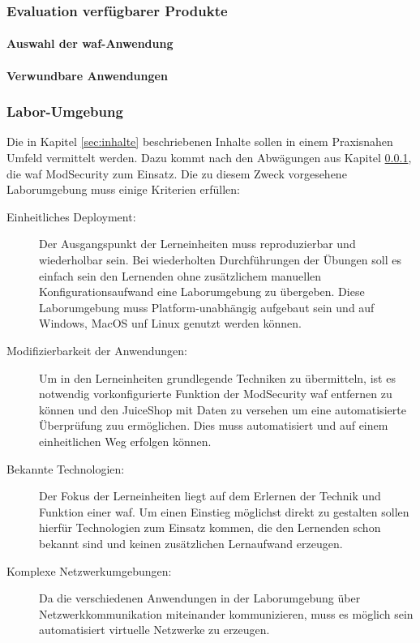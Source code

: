 \subsubsection{Evaluation verfügbarer Produkte}
\label{sec:produkt-eval}
\paragraph{Auswahl der \ac{waf}-Anwendung}

\paragraph{Verwundbare Anwendungen}

\subsubsection{Labor-Umgebung}

Die in Kapitel \ref{sec:inhalte} beschriebenen Inhalte sollen in einem Praxisnahen Umfeld vermittelt werden.
Dazu kommt nach den Abwägungen aus Kapitel \ref{sec:produkt-eval}, die \ac{waf} ModSecurity zum Einsatz.
Die zu diesem Zweck vorgesehene Laborumgebung muss einige Kriterien erfüllen:
\begin{description}
    \item[Einheitliches Deployment:] Der Ausgangspunkt der Lerneinheiten muss reproduzierbar und wiederholbar sein. 
    Bei wiederholten Durchführungen der Übungen soll es einfach sein den Lernenden ohne zusätzlichem manuellen Konfigurationsaufwand eine Laborumgebung zu übergeben. 
    Diese Laborumgebung muss Platform-unabhängig aufgebaut sein und auf Windows, MacOS unf Linux genutzt werden können.
    \item[Modifizierbarkeit der Anwendungen:] Um in den Lerneinheiten grundlegende Techniken zu übermitteln, ist es notwendig vorkonfigurierte Funktion der ModSecurity \ac{waf} entfernen zu können und den JuiceShop mit Daten zu versehen um eine automatisierte Überprüfung zuu ermöglichen.
    Dies muss automatisiert und auf einem einheitlichen Weg erfolgen können.
    \item[Bekannte Technologien:] Der Fokus der Lerneinheiten liegt auf dem Erlernen der Technik und Funktion einer \ac{waf}. 
    Um einen Einstieg möglichst direkt zu gestalten sollen hierfür Technologien zum Einsatz kommen, die den Lernenden schon bekannt sind und keinen zusätzlichen Lernaufwand erzeugen.
    \item[Komplexe Netzwerkumgebungen:] Da die verschiedenen Anwendungen in der Laborumgebung über Netzwerkkommunikation miteinander kommunizieren, muss es möglich sein automatisiert virtuelle Netzwerke zu erzeugen.
\end{description}

